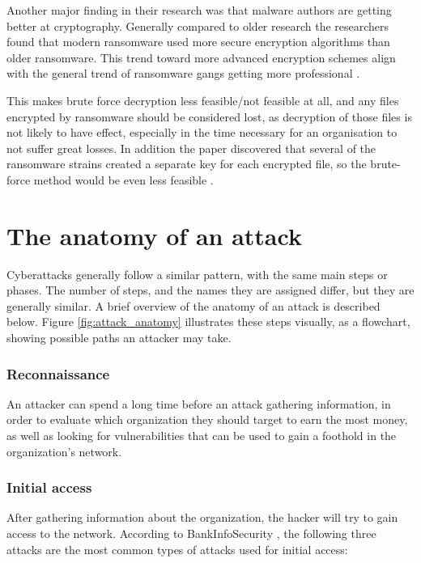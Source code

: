 Another major finding in their research was that malware authors are getting better at cryptography. Generally compared to older research the researchers found that modern ransomware used more secure encryption algorithms than older ransomware. This trend toward more advanced encryption schemes align with the general trend of ransomware gangs getting more professional \cite{ploszek_analysis_2021}.

This makes brute force decryption less feasible/not feasible at all, and any files encrypted by ransomware should be considered lost, as decryption of those files is not likely to have effect, especially in the time necessary for an organisation to not suffer great losses. In addition the paper discovered that several of the ransomware strains created a separate key for each encrypted file, so the brute-force method would be even less feasible \cite{ploszek_analysis_2021}.
    
\section{The anatomy of an attack} \label{Anatomy}

Cyberattacks generally follow a similar pattern,
with the same main steps or phases.
The number of steps, and the names they are assigned differ,
but they are generally similar.
A brief overview of the anatomy of an attack is described below.
Figure \ref{fig:attack_anatomy} illustrates these steps visually,
as a flowchart, showing possible paths an attacker may take.

\subsubsection{Reconnaissance}
An attacker can spend a long time before an attack gathering information,
in order to evaluate which organization they should target to earn the most money,
as well as looking for vulnerabilities that can be used to gain a foothold
in the organization's network.

\subsubsection{Initial access}

After gathering information about the organization, 
the hacker will try to gain access to the network.
According to BankInfoSecurity \cite{may_29_top_nodate},
the following three attacks are the most common types of attacks used for
initial access:

